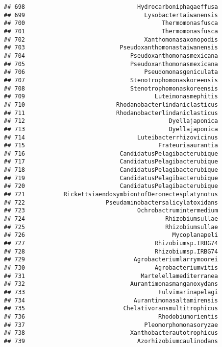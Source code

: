 \documentclass[
]{article}
\begin{document}
\begin{verbatim}
## 698                                Hydrocarboniphagaeffusa
## 699                                  Lysobactertaiwanensis
## 700                                       Thermomonasfusca
## 701                                       Thermomonasfusca
## 702                                  Xanthomonasaxonopodis
## 703                           Pseudoxanthomonastaiwanensis
## 704                              Pseudoxanthomonasmexicana
## 705                              Pseudoxanthomonasmexicana
## 706                                  Pseudomonasgeniculata
## 707                              Stenotrophomonaskoreensis
## 708                              Stenotrophomonaskoreensis
## 709                                     Luteimonasmephitis
## 710                          Rhodanobacterlindaniclasticus
## 711                          Rhodanobacterlindaniclasticus
## 712                                         Dyellajaponica
## 713                                         Dyellajaponica
## 714                                Luteibacterrhizovicinus
## 715                                      Frateuriaaurantia
## 716                           CandidatusPelagibacterubique
## 717                           CandidatusPelagibacterubique
## 718                           CandidatusPelagibacterubique
## 719                           CandidatusPelagibacterubique
## 720                           CandidatusPelagibacterubique
## 721           RickettsiaendosymbiontofDeronectesplatynotus
## 722                       Pseudaminobactersalicylatoxidans
## 723                                Ochrobactrumintermedium
## 724                                        Rhizobiumsullae
## 725                                        Rhizobiumsullae
## 726                                          Mycoplanapeli
## 727                                     Rhizobiumsp.IRBG74
## 728                                     Rhizobiumsp.IRBG74
## 729                               Agrobacteriumlarrymoorei
## 730                                     Agrobacteriumvitis
## 731                                 Martelellamediterranea
## 732                              Aurantimonasmanganoxydans
## 733                                      Fulvimarinapelagi
## 734                               Aurantimonasaltamirensis
## 735                            Chelativoransmultitrophicus
## 736                                      Rhodobiumorientis
## 737                                  Pleomorphomonasoryzae
## 738                              Xanthobacterautotrophicus
## 739                                Azorhizobiumcaulinodans

\end{verbatim}
\end{document}
